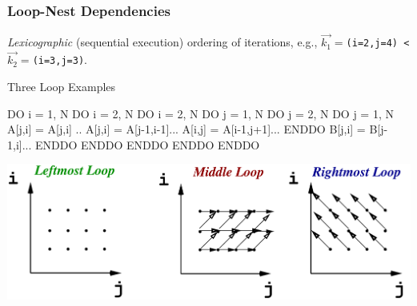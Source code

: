 \documentclass{beamer}
\begin{document}
\begin{frame}[fragile,t]
  \frametitle{Loop-Nest Dependencies} %

{\em Lexicographic} (sequential execution) ordering of iterations, 
e.g., {\tt$\vec{k_1}=$(i=2,j=4) < $\vec{k_2}=$(i=3,j=3)}.

\begin{block}{Three Loop Examples}
\begin{colorcode}
DO i = 1, N             DO i = 2, N                 DO i = 2, N
  DO j = 1, N             DO j = 2, N                 DO j = 1, N 
    A[j,i] = A[j,i] ..      A[j,i] = A[j-1,i-1]...        A[i,j] = A[i-1,j+1]...
  ENDDO                     B[j,i] = B[j-1,i]...      ENDDO
ENDDO                   ENDDO ENDDO                 ENDDO
\end{colorcode}
\end{block} 
\pause

\hspace{-3ex}\includegraphics[height=23ex]{ParTeaserFigs/LoopDeps}  

\end{frame}
\end{document}
